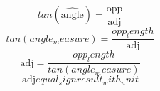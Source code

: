 \[tan(\widehat{{\text{{{angle}}}}})=\frac{{\text{{{opp}}}}}{{\text{{{adj}}}}}\]
\[tan({angle_measure})=\frac{{{opp_length}}}{{\text{{{adj}}}}}\]
\[\text{{{adj}}}=\frac{{{opp_length}}}{{tan({angle_measure})}}\]
\[\text{{{adj}}}{equal_sign}{result_with_unit}\]
